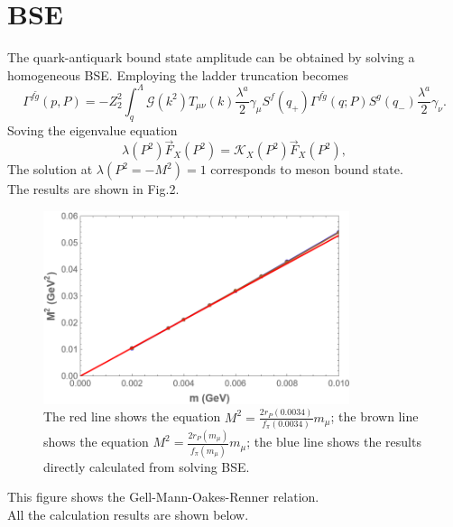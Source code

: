 \documentclass{article}
\begin{document}
\section{BSE}
The quark-antiquark bound state amplitude can be obtained by solving a homogeneous BSE. Employing the ladder truncation becomes
\begin{equation}
    \Gamma^{f\widetilde{g}}\left(p,P\right)=-Z_2^2\int_{q}^{\Lambda}\mathcal{G}\left(k^2\right)T_{\mu\nu}\left(k\right)\frac{\lambda^a}{2}\gamma_{\mu}S^f\left(q_+\right)\Gamma^{f\widetilde{g}}\left(q;P\right)S^g\left(q_-\right)\frac{\lambda^a}{2}\gamma_{\nu}.
\end{equation}
Soving the eigenvalue equation
\begin{equation}
    \lambda\left(P^2\right)\overrightarrow{F}_X\left(P^2\right)=\mathcal{K}_X\left(P^2\right)\overrightarrow{F}_X\left(P^2\right),
\end{equation}
The solution at $\lambda\left(P^2=-M^2\right)=1$ corresponds to meson bound state.\\
The results are shown in Fig.2.
\begin{figure}[H]
    \centering
    \includegraphics[width=0.8\textwidth]{pm-M^2.png}
    \caption{The red line shows the equation $M^2=\frac{2r_P(0.0034)}{f_\pi(0.0034)}m_\mu$; the brown line shows the equation $M^2=\frac{2r_P(m_\mu)}{f_\pi(m_\mu)}m_\mu$; the blue line shows the results directly calculated from solving BSE.}
\end{figure}
This figure shows the Gell-Mann-Oakes-Renner relation.\\
All the calculation results are shown below.
\end{document}
